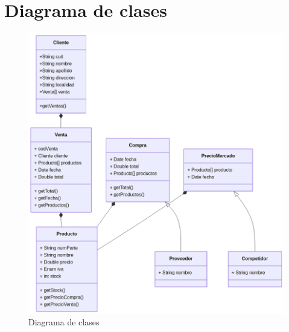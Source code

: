\section{Diagrama de clases}

\begin{figure}[!h]
	\vspace{20pt}
	\centering
	\includegraphics[width=\textwidth]{img/03-diagrama-clases}
	\caption{Diagrama de clases}
	\vspace{15pt}
\end{figure}
